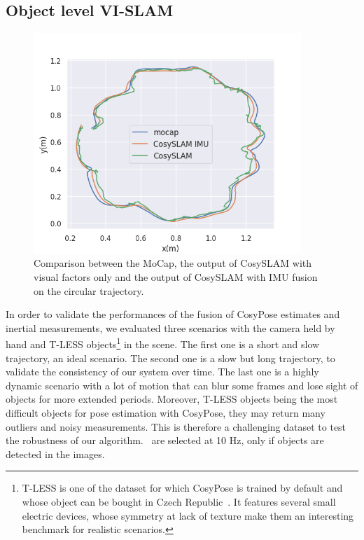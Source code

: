 \subsection{Object level VI-SLAM}

\begin{figure}[h]
  \centering
  \includegraphics[width=0.9\textwidth]{figures/cosyslam/trajectory_circular.png}
  \caption{Comparison between the MoCap, the output of CosySLAM with visual factors only and the output of CosySLAM with IMU fusion on the circular trajectory.}
  \label{fig:traj_circular}
\end{figure}

In order to validate the performances of the fusion of CosyPose estimates and inertial measurements, we evaluated three scenarios with the camera held by hand and 
T-LESS objects\footnote{T-LESS is one of the dataset for which CosyPose is trained by default and whose object can be bought in Czech Republic~\cite{hodan17t}. 
It features several small electric devices, whose symmetry at lack of texture make them an interesting benchmark for realistic scenarios.} in the scene. 
The first one is a short and slow trajectory, \ie an ideal scenario. The second one is a slow but long trajectory, to validate the consistency of our system over time. 
The last one is a highly dynamic scenario with a lot of motion that can blur some frames and lose sight of objects for more extended periods. 
Moreover, T-LESS objects being the most difficult objects for pose estimation with CosyPose, they may return many outliers and noisy measurements. 
This is therefore a challenging dataset to test the robustness of our algorithm. \Keyframes\ are selected at 10 Hz, only if objects are detected in the images.


